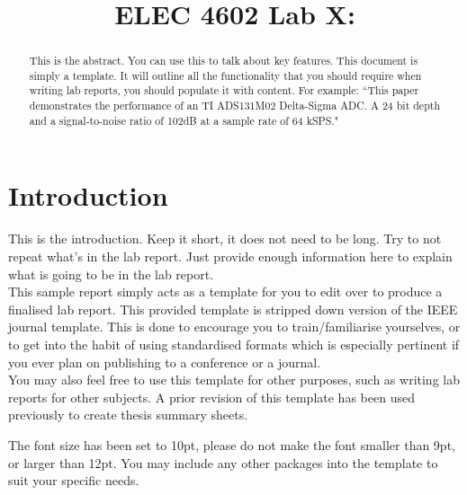 \documentclass[conference,10pt]{IEEEtran}
\begin{document}
\title{ELEC 4602 Lab X: }

\author{
        }

\IEEEspecialpapernotice{\today}

\maketitle

\begin{abstract}
    This is the abstract. You can use this to talk about key features. This document is simply a template. It will outline all the functionality that you should require when writing lab reports, you should populate it with content. For example: ``This paper demonstrates the performance of an TI ADS131M02 Delta-Sigma ADC. A 24 bit depth and a signal-to-noise ratio of 102dB at a sample rate of 64 kSPS."
\end{abstract}

\IEEEpeerreviewmaketitle

\section{Introduction}
    This is the introduction. Keep it short, it does not need to be long. Try to not repeat what's in the lab report. Just provide enough information here to explain what is going to be in the lab report.\\
    
    This sample report simply acts as a template for you to edit over to produce a finalised lab report. This provided template is stripped down version of the IEEE journal template. This is done to encourage you to train/familiarise yourselves, or to get into the habit of using standardised formats which is especially pertinent if you ever plan on publishing to a conference or a journal.\\
    
    You may also feel free to use this template for other purposes, such as writing lab reports for other subjects. A prior revision of this template has been used previously to create thesis summary sheets.
    
    The font size has been set to 10pt, please do not make the font smaller than 9pt, or larger than 12pt. You may include any other packages into the template to suit your specific needs.
    
\end{document}
